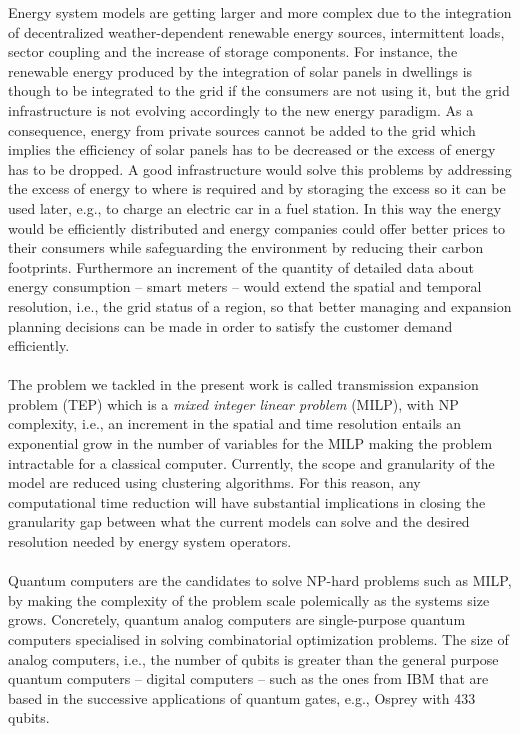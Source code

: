 Energy system models are getting larger and more complex due to the integration of decentralized weather-dependent renewable energy sources, intermittent loads, sector coupling and the increase of storage components. For instance, the renewable energy produced by the integration of solar panels in dwellings is though to be integrated to the grid if the consumers are not using it, but the grid infrastructure is not evolving accordingly to the new energy paradigm. As a consequence, energy from private sources cannot be added to the grid which implies the efficiency of solar panels has to be decreased or the excess of energy has to be dropped. A good infrastructure would solve this problems by addressing the excess of energy to where is required and by storaging the excess so it can be used later, e.g., to charge an electric car in a fuel station. In this way the energy would be efficiently distributed and energy companies could offer better prices to their consumers while safeguarding the environment by reducing their carbon footprints. Furthermore an increment of the quantity of detailed data about energy consumption -- smart meters -- would extend the spatial and temporal resolution, i.e., the grid status of a region, so that better managing and expansion planning decisions can be made in order to satisfy the customer demand efficiently.\\\\ 
The problem we tackled in the present work is called transmission expansion problem (TEP) which is a \textit{mixed integer linear problem} (MILP), with NP complexity, i.e., an increment in the spatial and time resolution entails an exponential grow in the number of variables for the MILP making the problem intractable for a classical computer. Currently, the scope and granularity of the model are reduced using clustering algorithms. For this reason, any computational time reduction will have substantial implications in closing the granularity gap between what the current models can solve and the desired resolution needed by energy system operators.\\\\
Quantum computers are the candidates to solve NP-hard problems such as MILP, by making the complexity of the problem scale polemically as the systems size grows. Concretely, quantum analog computers are single-purpose quantum computers specialised in solving combinatorial optimization problems. The size of analog computers, i.e., the number of qubits is greater than the general purpose quantum computers -- digital computers -- such as the ones from IBM that are based in the successive applications of quantum gates, e.g., Osprey with 433 qubits.
